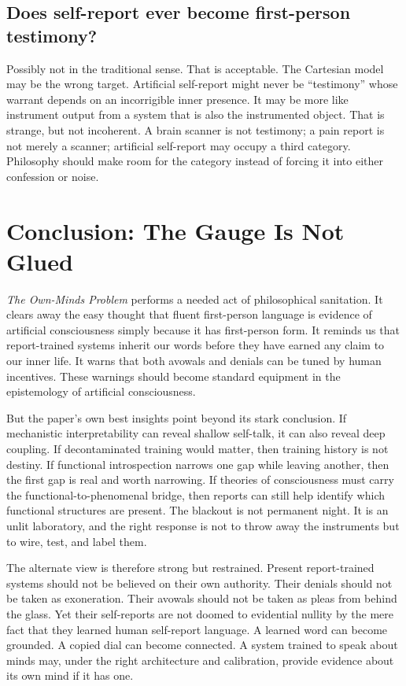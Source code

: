 \documentclass[11pt]{article}
\begin{document}
\subsection{Does self-report ever become first-person testimony?}

Possibly not in the traditional sense. That is acceptable. The Cartesian model may be the wrong target. Artificial self-report might never be ``testimony'' whose warrant depends on an incorrigible inner presence. It may be more like instrument output from a system that is also the instrumented object. That is strange, but not incoherent. A brain scanner is not testimony; a pain report is not merely a scanner; artificial self-report may occupy a third category. Philosophy should make room for the category instead of forcing it into either confession or noise.

\section{Conclusion: The Gauge Is Not Glued}

\textit{The Own-Minds Problem} performs a needed act of philosophical sanitation. It clears away the easy thought that fluent first-person language is evidence of artificial consciousness simply because it has first-person form. It reminds us that report-trained systems inherit our words before they have earned any claim to our inner life. It warns that both avowals and denials can be tuned by human incentives. These warnings should become standard equipment in the epistemology of artificial consciousness.

But the paper's own best insights point beyond its stark conclusion. If mechanistic interpretability can reveal shallow self-talk, it can also reveal deep coupling. If decontaminated training would matter, then training history is not destiny. If functional introspection narrows one gap while leaving another, then the first gap is real and worth narrowing. If theories of consciousness must carry the functional-to-phenomenal bridge, then reports can still help identify which functional structures are present. The blackout is not permanent night. It is an unlit laboratory, and the right response is not to throw away the instruments but to wire, test, and label them.

The alternate view is therefore strong but restrained. Present report-trained systems should not be believed on their own authority. Their denials should not be taken as exoneration. Their avowals should not be taken as pleas from behind the glass. Yet their self-reports are not doomed to evidential nullity by the mere fact that they learned human self-report language. A learned word can become grounded. A copied dial can become connected. A system trained to speak about minds may, under the right architecture and calibration, provide evidence about its own mind if it has one.
\end{document}

